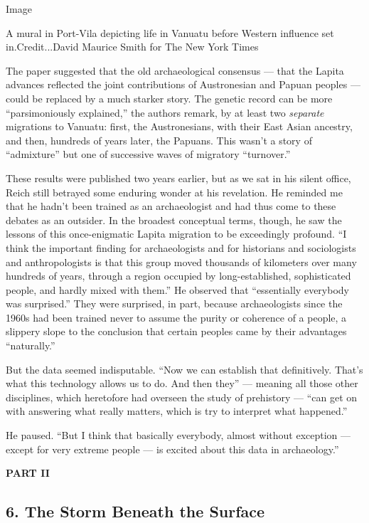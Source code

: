 Image

A mural in Port-Vila depicting life in Vanuatu before Western influence
set in.Credit...David Maurice Smith for The New York Times

The paper suggested that the old archaeological consensus --- that the
Lapita advances reflected the joint contributions of Austronesian and
Papuan peoples --- could be replaced by a much starker story. The
genetic record can be more ``parsimoniously explained,'' the authors
remark, by at least two \emph{separate} migrations to Vanuatu: first,
the Austronesians, with their East Asian ancestry, and then, hundreds of
years later, the Papuans. This wasn't a story of ``admixture'' but one
of successive waves of migratory ``turnover.''

These results were published two years earlier, but as we sat in his
silent office, Reich still betrayed some enduring wonder at his
revelation. He reminded me that he hadn't been trained as an
archaeologist and had thus come to these debates as an outsider. In the
broadest conceptual terms, though, he saw the lessons of this
once-enigmatic Lapita migration to be exceedingly profound. ``I think
the important finding for archaeologists and for historians and
sociologists and anthropologists is that this group moved thousands of
kilometers over many hundreds of years, through a region occupied by
long-established, sophisticated people, and hardly mixed with them.'' He
observed that ``essentially everybody was surprised.'' They were
surprised, in part, because archaeologists since the 1960s had been
trained never to assume the purity or coherence of a people, a slippery
slope to the conclusion that certain peoples came by their advantages
``naturally.''

But the data seemed indisputable. ``Now we can establish that
definitively. That's what this technology allows us to do. And then
they'' --- meaning all those other disciplines, which heretofore had
overseen the study of prehistory --- ``can get on with answering what
really matters, which is try to interpret what happened.''

He paused. ``But I think that basically everybody, almost without
exception --- except for very extreme people --- is excited about this
data in archaeology.''

\textbf{PART II}

\hypertarget{6-the-storm-beneath-the-surface}{%
\subsection{\texorpdfstring{\textbf{6. The Storm Beneath the
Surface}}{6. The Storm Beneath the Surface}}\label{6-the-storm-beneath-the-surface}}

